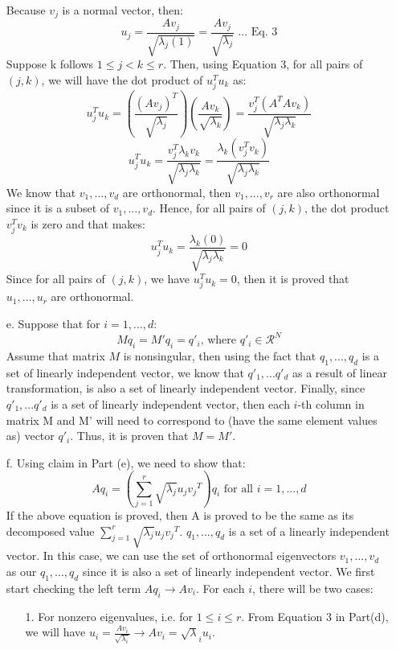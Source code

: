 \documentclass[twoside]{homework}
\begin{document}
\begin{itemize}
    Because $v_j$ is a normal vector, then:
    $$ u_j = \frac{Av_j}{\sqrt{{\lambda}_j(1)}} = \frac{Av_j}{\sqrt{{\lambda}_j}} \text{ ... Eq. 3}$$
    Suppose k follows $1\leq{j}<k\leq{r}$.
    Then, using Equation 3, for all pairs of $(j, k)$, we will have the dot product of $u_j^Tu_k$ as:
    $$ u_j^Tu_k = (\frac{(Av_j)^T}{\sqrt{{\lambda}_j}}) (\frac{Av_k}{\sqrt{{\lambda}_k}}) = \frac{v_j^T(A^TAv_k)}{\sqrt{{\lambda}_j\lambda_k}} $$
    $$ u_j^Tu_k =
    \frac{v_j^T{\lambda}_kv_k}{\sqrt{{\lambda}_j\lambda_k}} = \frac{{\lambda}_k(v_j^Tv_k)}{\sqrt{{\lambda}_j\lambda_k}} $$
    We know that $v_1, ..., v_d$ are orthonormal, then $v_1, ..., v_r$ are also orthonormal since it is a subset of $v_1, ..., v_d$. Hence, for all pairs of $(j,k)$, the dot product $v_j^Tv_k$ is zero and that makes:
    $$ u_j^Tu_k = \frac{{\lambda}_k(0)}{\sqrt{{\lambda}_j\lambda_k}} = 0$$
    Since for all pairs of $(j,k)$, we have $u_j^Tu_k = 0$, then it is proved that $u_1, ..., u_r$ are orthonormal.
    \item[e.] Suppose that for $i=1,...,d$:
    $$Mq_i=M'q_i=q'_i \text{, where } q'_i \in \mathcal{R}^N$$
    Assume that matrix $M$ is nonsingular, then using the fact that $q_1,...,q_d$ is a set of linearly independent vector, we know that $q'_1,...q'_d$ as a result of linear transformation, is also a set of linearly independent vector.
    \newline\newline
    Finally, since $q'_1,...q'_d$ is a set of linearly independent vector, then each $i$-th column in matrix M and M' will need to correspond to (have the same element values as) vector $q'_i$. Thus, it is proven that $M = M'$.
    \item[f.] Using claim in Part (e), we need to show that:
    $$Aq_i=(\sum_{j=1}^r\sqrt{{\lambda}_j}u_j{v_j}^T)q_i \text{ for all } i=1,...,d$$
    If the above equation is proved, then A is proved to be the same as its decomposed value $\sum_{j=1}^r\sqrt{{\lambda}_j}u_j{v_j}^T$. $q_1, ..., q_d$ is a set of a linearly independent vector. In this case, we can use the set of orthonormal eigenvectors $v_1, ..., v_d$ as our $q_1, ..., q_d$ since it is also a set of linearly independent vector.
    \newline\newline
    We first start checking the left term $Aq_i\xrightarrow{}Av_i$. For each $i$, there will be two cases:
    \begin{itemize}
        \item[1.] For nonzero eigenvalues, i.e. for $1\leq{i}\leq{r}$. From Equation 3 in Part(d), we will have $ u_i = \frac{Av_i}{\sqrt{{\lambda}_i}} \xrightarrow{} Av_i = \sqrt{\lambda}_iu_i$.

\end{itemize}
\end{itemize}
\end{document}
